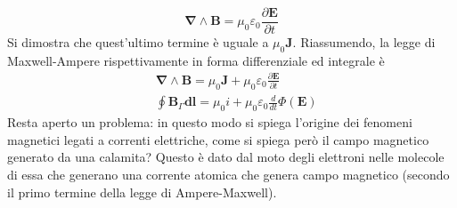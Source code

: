 \documentclass[10pt,a4paper]{article}
\begin{document}
\[\mathbf{\nabla}\wedge\mathbf{B}=\mu_0\varepsilon_0\frac{\partial \mathbf{E}}{\partial t}\]
Si dimostra che quest'ultimo termine è uguale a \(\mu_0\mathbf{J}\).
Riassumendo, la legge di Maxwell-Ampere rispettivamente in forma differenziale ed integrale è
\begin{align}\label{eq:legge_Maxwell_Ampere}
	&\mathbf{\nabla}\wedge\mathbf{B}=\mu_0\mathbf{J}+\mu_0\varepsilon_0\frac{\partial\mathbf{E}}{\partial t}\\
	&\oint\mathbf{B}_{\Gamma}\mathbf{dl}= \mu_0 i + \mu_0\varepsilon_0\frac{d}{dt}\Phi(\mathbf{E})
\end{align}
Resta aperto un problema: in questo modo si spiega l'origine dei fenomeni magnetici legati a correnti elettriche, come si spiega però il campo magnetico generato da una calamita? Questo è dato dal moto degli elettroni nelle molecole di essa che generano una corrente atomica che genera campo magnetico (secondo il primo termine della legge di Ampere-Maxwell).
\end{document}
